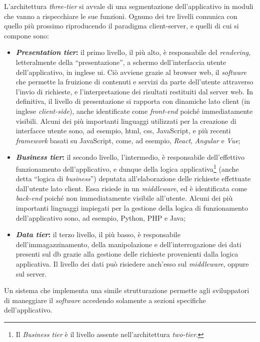 L'architettura \textit{three-tier} si avvale di una segmentazione dell'applicativo in moduli che vanno a rispecchiare le sue funzioni. Ognuno dei tre livelli comunica con quello più prossimo riproducendo il paradigma client-server, e quelli di cui si compone sono:
\begin{itemize}
  \item \textbf{\textit{Presentation tier}:} il primo livello, il più alto, è responsabile del \textit{rendering}, letteralmente della “presentazione”, a schermo dell'interfaccia utente dell'applicativo, in inglese \gls{ui}. Ciò avviene grazie al browser web, il \textit{software} che permette la fruizione di contenuti e servizi da parte dell'utente attraverso l'invio di richieste, e l'interpretazione dei risultati restituiti dal server web. In definitiva, il livello di presentazione si rapporta con dinamiche lato client (in inglese \textit{client-side}), anche identificate come \textit{front-end} poiché immediatamente visibili. Alcuni dei più importanti linguaggi utilizzati per la creazione di interfacce utente sono, ad esempio, \gls{html}, \gls{css}, JavaScript, e più recenti  \textit{framework} basati su JavaScript, come, ad esempio, \textit{React}, \textit{Angular} e \textit{Vue};
  
  \item \textbf{\textit{Business tier}:} il secondo livello, l'intermedio, è responsabile dell'effettivo funzionamento dell'applicativo, e dunque della logica applicativa\footnote{Il \textit{Business tier} è il livello assente nell'architettura \textit{two-tier}.} (anche detta “logica di \textit{business}”) deputata all'elaborazione delle richieste effettuate dall'utente lato client. Essa risiede in un \textit{middleware}, ed è identificata come \textit{back-end} poiché non immediatamente visibile all'utente. Alcuni dei più importanti linguaggi impiegati per la gestione della logica di funzionamento dell'applicativo sono, ad esempio, Python, PHP e Java;
  
  \item \textbf{\textit{Data tier}:} il terzo livello, il più basso, è responsabile dell'immagazzinamento, della manipolazione e dell'interrogazione dei dati presenti sul \gls{db} grazie alla gestione delle richieste provenienti dalla logica applicativa. Il livello dei dati può risiedere anch'esso sul \textit{middleware}, oppure sul server.
\end{itemize}
Un sistema che implementa una simile strutturazione permette agli sviluppatori di maneggiare il \textit{software} accedendo solamente a sezioni specifiche dell'applicativo.

